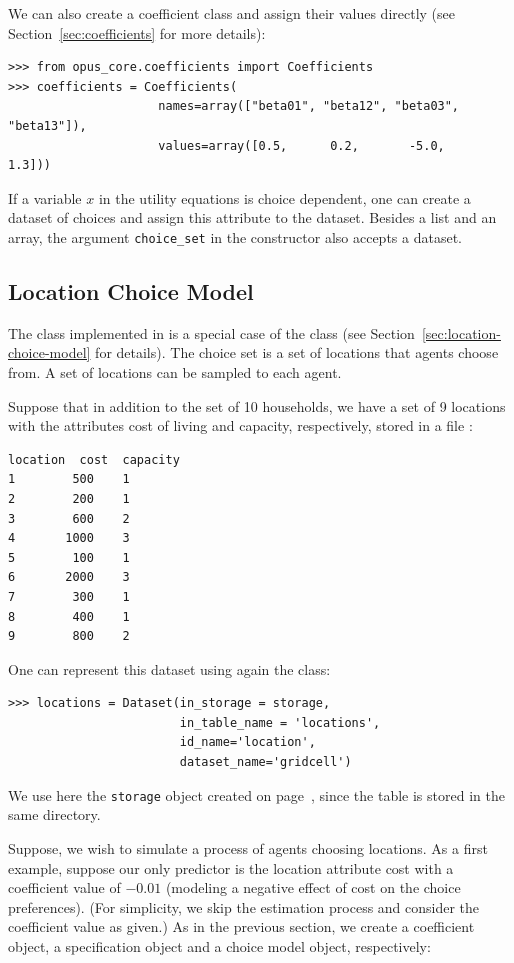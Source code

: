 We can also create a coefficient \coefficientsindex class and assign their values directly
(see Section~\ref{sec:coefficients} for more details):
\coefficientsindex
\begin{verbatim}
>>> from opus_core.coefficients import Coefficients
>>> coefficients = Coefficients(
                     names=array(["beta01", "beta12", "beta03", "beta13"]),
                     values=array([0.5,      0.2,       -5.0,     1.3]))
\end{verbatim}

If a variable \variablesindex $x$ in the utility equations is choice dependent,
one can create a dataset \datasetindex of choices and assign this attribute to the
dataset. \datasetindex Besides a list and an array, the argument \verb|choice_set| in the
 constructor also accepts a dataset. \datasetindex

%
\subsection{Location Choice Model}
%
\label{sec:LCM}
%
The  class implemented in  is a special case of the
 class (see Section~\ref{sec:location-choice-model} for details).
The choice set is a set of locations that agents choose
from. A set of locations can be sampled to each agent.

Suppose that in addition to the set of 10 households, we have a set of 9
locations with the attributes cost of living and capacity, respectively,
stored in a file :
\begin{verbatim}
location  cost  capacity
1        500    1
2        200    1
3        600    2
4       1000    3
5        100    1
6       2000    3
7        300    1
8        400    1
9        800    2
\end{verbatim}
One can represent this dataset using again the   class:
\label{page:tutorial-gc-locations}
\begin{verbatim}
>>> locations = Dataset(in_storage = storage,
                        in_table_name = 'locations', 
                        id_name='location',
                        dataset_name='gridcell')
\end{verbatim}
We use here the \verb|storage| object
created on page~\pageref{storagepage}, since the table is stored in the same directory.

Suppose, we wish to simulate a process of agents choosing locations.  As a
first example, suppose our only predictor is the location attribute cost with
a coefficient \coefficientsindex value of $-0.01$ (modeling a negative effect of cost on the
choice preferences). (For simplicity, we skip the estimation process and
consider the coefficient \coefficientsindex value as given.) As in the previous section, we
create a coefficient \coefficientsindex object, a specification object and a choice model object,
respectively:

